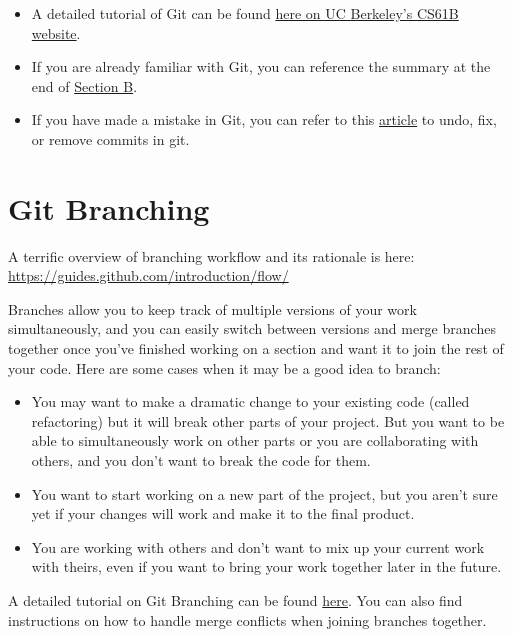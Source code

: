 \documentclass[]{book}
\providecommand{\tightlist}{%
  \setlength{\itemsep}{0pt}\setlength{\parskip}{0pt}}
\begin{document}
\begin{itemize}
\tightlist
\item
  A detailed tutorial of Git can be found \href{https://sp19.datastructur.es/materials/guides/using-git\#b-local-repositories-narrative-introduction}{here on UC Berkeley's CS61B website}.
\item
  If you are already familiar with Git, you can reference the summary at the end of \href{https://sp19.datastructur.es/materials/guides/using-git\#b-local-repositories-narrative-introduction}{Section B}.
\item
  If you have made a mistake in Git, you can refer to this \href{https://sethrobertson.github.io/GitFixUm/fixup.html}{article} to undo, fix, or remove commits in git.
\end{itemize}

\hypertarget{git-branching}{%
\section{Git Branching}\label{git-branching}}

A terrific overview of branching workflow and its rationale is here: \url{https://guides.github.com/introduction/flow/}

Branches allow you to keep track of multiple versions of your work simultaneously, and you can easily switch between versions and merge branches together once you've finished working on a section and want it to join the rest of your code. Here are some cases when it may be a good idea to branch:

\begin{itemize}
\tightlist
\item
  You may want to make a dramatic change to your existing code (called refactoring) but it will break other parts of your project. But you want to be able to simultaneously work on other parts or you are collaborating with others, and you don't want to break the code for them.
\item
  You want to start working on a new part of the project, but you aren't sure yet if your changes will work and make it to the final product.
\item
  You are working with others and don't want to mix up your current work with theirs, even if you want to bring your work together later in the future.
\end{itemize}

A detailed tutorial on Git Branching can be found \href{https://sp19.datastructur.es/materials/guides/using-git\#e-git-branching-advanced-git-optional}{here}. You can also find instructions on how to handle merge conflicts when joining branches together.
\end{document}

